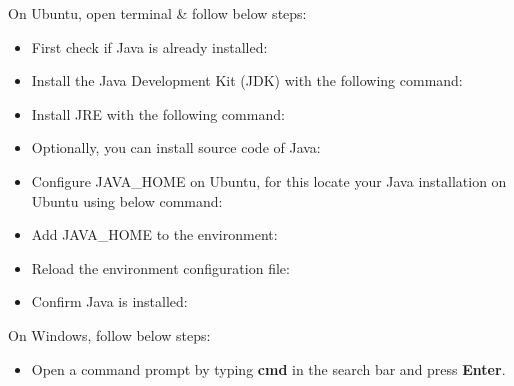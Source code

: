 \setlength{\columnsep}{5pt}
\begin{flushleft}

	On Ubuntu, open terminal \& follow below steps:
	\begin{itemize}
		\item First check if Java is already installed:
		\item Install the Java Development Kit (JDK) with the following command:
		
		\item Install JRE with the following command:
		\bigskip
		
		\item Optionally, you can install source code of Java:
		\bigskip
		\item Configure JAVA\_HOME on Ubuntu, for this locate your Java installation on Ubuntu using below command:
	
		\item Add JAVA\_HOME to the environment:
		\bigskip
	
		\item Reload the environment configuration file:
		\bigskip
		\item Confirm Java is installed:
		\bigskip
		
	\end{itemize}
	
	On Windows, follow below steps:
	
	\begin{itemize}
		\item Open a command prompt by typing \textbf{cmd} in the search bar and press \textbf{Enter}.
		

\end{itemize}
\end{flushleft}
